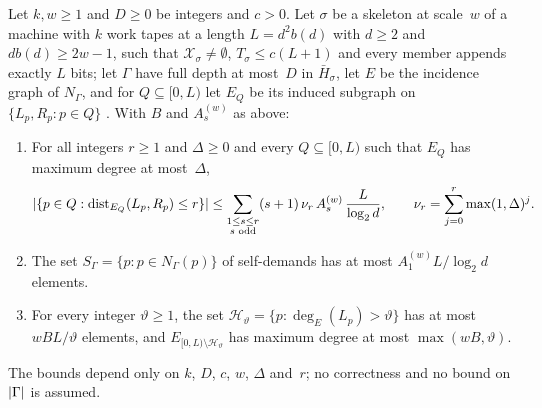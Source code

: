 \begin{proposition}\label{prop:skel-paired}
Let $k,w\ge1$ and $D\ge0$ be integers and $c>0$. Let $\sigma$ be a skeleton at scale~$w$ of a machine with $k$ work
tapes at a length $L=d^2b(d)$ with $d\ge2$ and $db(d)\ge2w-1$, such that $\mathcal X_\sigma\ne\emptyset$,
$T_\sigma\le c(L+1)$ and every member appends exactly $L$ bits; let $\Gamma$ have full depth at most~$D$ in
$\bar H_\sigma$, let $E$ be the incidence graph of $N_\Gamma$, and for $Q\subseteq[0,L)$ let $E_Q$ be its induced
subgraph on $\{L_p,R_p:p\in Q\}$ \cite[Definition~3.2]{DirectedRecovery2026}. With $B$ and $A^{(w)}_s$ as above:
\begin{enumerate}[label=(\alph*)]
\item For all integers $r\ge1$ and $\Delta\ge0$ and every $Q\subseteq[0,L)$ such that $E_Q$ has maximum degree at
most~$\Delta$,
\[
  \lvert \{p\in Q:\operatorname{dist}_{E_Q}(L_p,R_p)\le r\} \rvert\le\sum_{\substack{1\le s\le r\\ s\text{ odd}}}(s+1)\,\nu_r\,A^{(w)}_s\,
  \frac L{\log_2d},\qquad\nu_r=\sum_{j=0}^r\max(1,\Delta)^j .
\]
\item The set $S_\Gamma=\{p:p\in N_\Gamma(p)\}$ of self-demands has at most $A^{(w)}_1L/\log_2d$ elements.
\item For every integer $\vartheta\ge1$, the set $\mathcal H_\vartheta=\{p:\deg_E(L_p)>\vartheta\}$ has at most
$wBL/\vartheta$ elements, and $E_{[0,L)\setminus\mathcal H_\vartheta}$ has maximum degree at most $\max(wB,\vartheta)$.
\end{enumerate}
The bounds depend only on $k$, $D$, $c$, $w$, $\Delta$ and~$r$; no correctness and no bound on $\lvert \Gamma \rvert$ is assumed.
\end{proposition}

